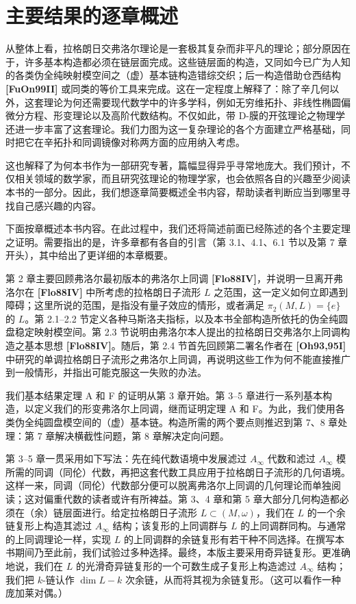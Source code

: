 
\section{主要结果的逐章概述}
\label{sec:1-5}

从整体上看，拉格朗日交弗洛尔理论是一套极其复杂而非平凡的理论；部分原因在于，许多基本构造都必须在链层面完成。这些链层面的构造，又同如今已广为人知的各类伪全纯映射模空间之（虚）基本链构造错综交织；后一构造借助仓西结构 \textbf{[FuOn99II]} 或同类的等价工具来完成。这在一定程度上解释了：除了辛几何以外，这套理论为何还需要现代数学中的许多学科，例如无穷维拓扑、非线性椭圆偏微分方程、形变理论以及高阶代数结构。不仅如此，带 D-膜的开弦理论之物理学还进一步丰富了这套理论。我们力图为这一复杂理论的各个方面建立严格基础，同时把它在辛拓扑和同调镜像对称两方面的应用纳入考虑。

这也解释了为何本书作为一部研究专著，篇幅显得异乎寻常地庞大。我们预计，不仅相关领域的数学家，而且研究弦理论的物理学家，也会依照各自的兴趣至少阅读本书的一部分。因此，我们想逐章简要概述全书内容，帮助读者判断应当到哪里寻找自己感兴趣的内容。

下面按章概述本书内容。在此过程中，我们还将简述前面已经陈述的各个主要定理之证明。需要指出的是，许多章都有各自的引言（第 3.1、4.1、6.1 节以及第 7 章开头），其中给出了更详细的本章概要。

第 2 章主要回顾弗洛尔最初版本的弗洛尔上同调 \textbf{[Flo88IV]}，并说明一旦离开弗洛尔在 \textbf{[Flo88IV]} 中所考虑的拉格朗日子流形 $L$ 之范围，这一定义如何立即遇到障碍；这里所说的范围，是指没有量子效应的情形，或者满足
$\pi_2(M,L)=\{e\}$ 的 $L$。第 2.1--2.2 节定义各种马斯洛夫指标，以及本书全部构造所依托的伪全纯圆盘稳定映射模空间。第 2.3 节说明由弗洛尔本人提出的拉格朗日交弗洛尔上同调构造之基本思想 \textbf{[Flo88IV]}。随后，第 2.4 节首先回顾第二署名作者在 \textbf{[Oh93,95I]} 中研究的单调拉格朗日子流形之弗洛尔上同调，再说明这些工作为何不能直接推广到一般情形，并指出可能克服这一失败的办法。

我们基本结果定理 A 和 F 的证明从第 3 章开始。第 3--5 章进行一系列基本构造，以定义我们的形变弗洛尔上同调，继而证明定理 A 和 F。为此，我们使用各类伪全纯圆盘模空间的（虚）基本链。构造所需的两个要点则推迟到第 7、8 章处理：第 7 章解决横截性问题，第 8 章解决定向问题。

第 3--5 章一贯采用如下写法：先在纯代数语境中发展滤过 $A_\infty$ 代数和滤过 $A_\infty$ 模所需的同调（同伦）代数，再把这套代数工具应用于拉格朗日子流形的几何语境。这样一来，同调（同伦）代数部分便可以脱离弗洛尔上同调的几何理论而单独阅读；这对偏重代数的读者或许有所裨益。第 3、4 章和第 5 章大部分几何构造都必须在（余）链层面进行。给定拉格朗日子流形 $L\subset(M,\omega)$，我们在 $L$ 的一个余链复形上构造其滤过 $A_\infty$ 结构；该复形的上同调群与 $L$ 的上同调群同构。与通常的上同调理论一样，实现 $L$ 的上同调群的余链复形有若干种不同选择。在撰写本书期间乃至此前，我们试验过多种选择。最终，本版主要采用奇异链复形。更准确地说，我们在 $L$ 的光滑奇异链复形的一个可数生成子复形上构造滤过 $A_\infty$ 结构；我们把 $k$-链认作 $\dim L-k$ 次余链，从而将其视为余链复形。（这可以看作一种庞加莱对偶。）

